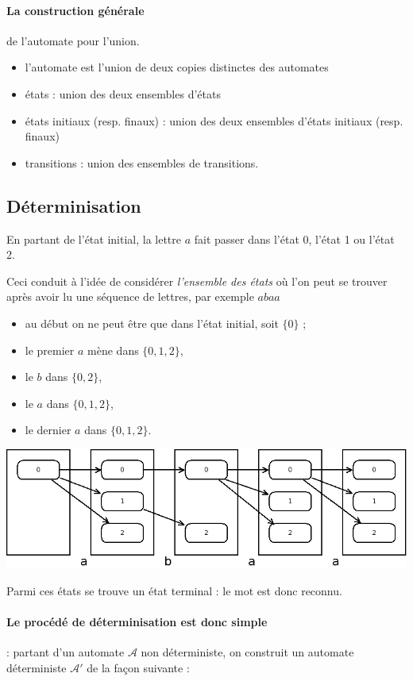 \documentclass[10pt,twoside]{article}
\begin{document}
\paragraph{La construction générale} de l'automate pour l'union.
\begin{itemize}
\item l'automate est l'union de deux copies distinctes des automates
\item états : union des deux ensembles d'états
\item états initiaux (resp. finaux) : union des deux ensembles d'états initiaux
(resp. finaux)
\item transitions : union des ensembles de transitions.
\end{itemize}


\subsection{Déterminisation}

En partant de l'état initial, la lettre $a$ fait passer dans l'état 0, l'état 1 ou l'état 2.

Ceci conduit à l'idée de considérer \emph{l'ensemble des états} où l'on peut se trouver après avoir lu une séquence de lettres, par exemple $abaa$
\begin{itemize}
\item au début on ne peut être que dans l'état initial, soit $\{0\}$ ;
\item le premier $a$ mène dans $\{ 0, 1, 2 \}$,
\item le $b$ dans $\{0, 2\}$,
\item le $a$ dans $\{ 0, 1, 2 \}$,
\item le dernier $a$ dans $\{ 0, 1, 2 \}$.
\end{itemize}

\begin{center}
\includegraphics[width=.9\linewidth]{../dia/deroulement}
\end{center}


Parmi ces états se trouve un état terminal : le mot est donc reconnu.

\paragraph{Le procédé de déterminisation est donc simple} : partant 
d'un automate $\mathcal{A}$ non 
déterministe, on construit un automate déterministe  $\mathcal{A'}$ de 
la façon suivante :
\end{document}
